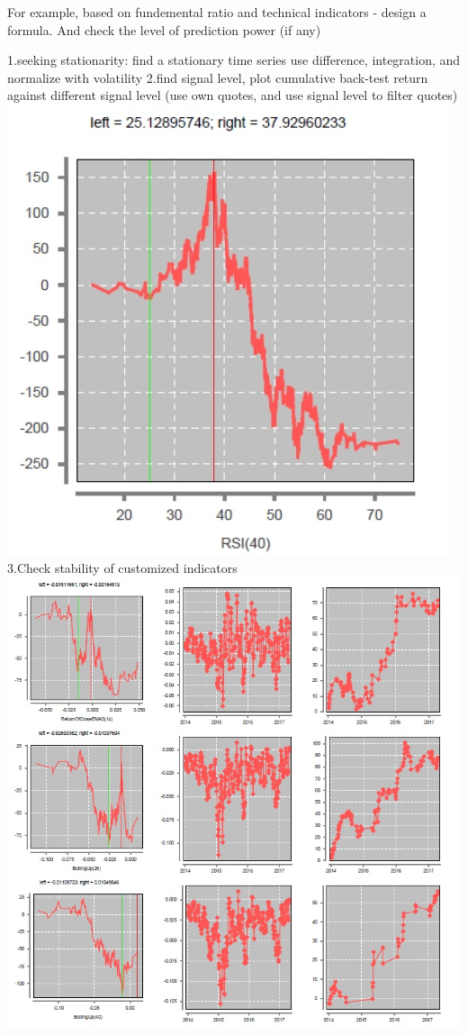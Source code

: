 \documentclass[11pt, openany]{book}              %
\begin{document}
For example, based on fundemental ratio and technical indicators - design a formula. And check the level of prediction power (if any)

1.seeking stationarity: find a stationary time series
	use difference, integration, and normalize with volatility 
2.find signal level, plot cumulative back-test return against different signal level (use own quotes, and use signal level to filter quotes)
\includegraphics[scale=0.5]{7.JPG}
3.Check stability of customized indicators 
\includegraphics[scale=0.5]{8.JPG}
\end{document}
